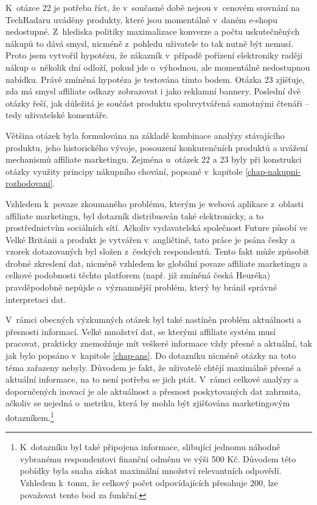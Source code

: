 \documentclass[12pt,twoside,openany]{fithesis}
\begin{document}
K~otázce 22 je potřeba říct, že v~současné době nejsou v~cenovém 
srovnání na TechRadaru uváděny produkty, které jsou momentálně v~daném 
e-shopu nedostupné. Z~hlediska politiky maximalizace konverze a počtu 
uskutečněných nákupů to dává smysl, nicméně z~pohledu uživatele to 
tak nutně být nemusí. Proto jsem vytvořil hypotézu, že zákazník 
v~případě pořízení elektroniky raději nákup o~několik dní odloží, 
pokud jde o~výhodnou, ale momentálně nedostupnou nabídku. Právě 
zmíněná hypotéza je testována tímto bodem. Otázka 23 zjišťuje, zda má 
smysl affiliate odkazy zobrazovat i jako reklamní bannery. Poslední dvě 
otázky řeší, jak důležitá je součást produktu spoluvytvářená 
samotnými čtenáři -- tedy uživatelské komentáře.

Většina otázek byla formulována na základě kombinace analýzy 
stávajícího produktu, jeho historického vývoje, posouzení konkurenčních 
produktů a uvážení mechanismů affiliate marketingu. Zejména u~otázek 22 
a 23 byly při konstrukci otázky využity principy nákupního chování, 
popsané v~kapitole 
\hyperlink{chap-nakupni-rozhodovani}{{\ref{chap-nakupni-rozhodovani}}}.

Vzhledem k~povaze zkoumaného problému, kterým je webová aplikace z~oblasti 
affiliate marketingu, byl dotazník distribuován také elektronicky, a to 
prostřednictvím sociálních sítí. Ačkoliv vydavatelská společnost 
Future působí ve Velké Británii a produkt je vytvářen v~angličtině, 
tato práce je psána česky a vzorek dotazovaných byl složen z~českých 
respondentů. Tento fakt může způsobit drobné zkreslení dat, nicméně 
vzhledem ke globální povaze affiliate marketingu a celkové podobnosti 
těchto platforem (např. již zmíněná česká Heuréka) pravděpodobně 
nepůjde o~významnější problém, který by bránil správné interpretaci 
dat.

V~rámci obecných výzkumných otázek byl také nastíněn problém 
aktuálnosti a přesnosti informací. Velké množství dat, se kterými 
affiliate systém musí pracovat, prakticky znemožňuje mít veškeré 
informace vždy přesné a aktuální, tak jak bylo popsáno v~kapitole 
\hyperlink{chap-ans}{{\ref{chap-ans}}}. Do dotazníku nicméně otázky na toto 
téma zařazeny nebyly. Důvodem je fakt, že uživatelé chtějí maximálně 
přesné a aktuální informace, na to není potřeba se jich ptát. V~rámci 
celkové analýzy a doporučených inovací je ale aktuálnost a přesnost 
poskytovaných dat zahrnuta, ačkoliv se nejedná o~metriku, která by mohla 
být zjišťována marketingovým 
dotazníkem.\footnote{
    K~dotazníku byl také připojena informace, slibující jednomu náhodně 
vybranému respondentovi finanční odměnu ve výši 500 Kč. Důvodem této 
pobídky byla snaha získat maximální množství relevantních odpovědí. 
Vzhledem k~tomu, že celkový počet odpovídajících přesahuje 200, lze 
považovat tento bod za funkční.
}
\end{document}

